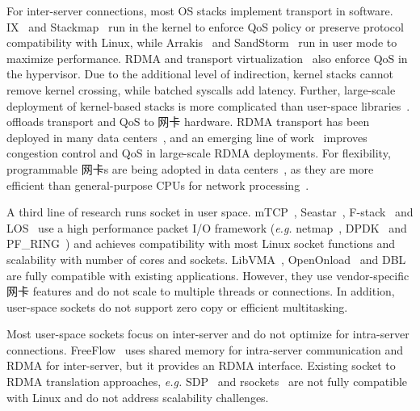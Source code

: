 For inter-server connections, most OS stacks implement transport in software. IX~\cite{belay2017ix} and Stackmap~\cite{yasukata2016stackmap} run in the kernel to enforce QoS policy or preserve protocol compatibility with Linux, while Arrakis~\cite{peter2016arrakis} and SandStorm~\cite{marinos2014network} run in user mode to maximize performance.
RDMA and transport virtualization~\cite{tsai2017lite,niu2017network} also enforce QoS in the hypervisor.
Due to the additional level of indirection, kernel stacks cannot remove kernel crossing, while batched syscalls add latency.
Further, large-scale deployment of kernel-based stacks is more complicated than user-space libraries~\cite{andromeda}.
\sys offloads transport and QoS to 网卡 hardware.
RDMA transport has been deployed in many data centers~\cite{guo2016rdma}, and an emerging line of work~\cite{zhu2015congestion,lu2017memory,mprdma} improves congestion control and QoS in large-scale RDMA deployments.
For flexibility, programmable 网卡s are being adopted in data centers~\cite{smartnic,cavium}, as they are more efficient than general-purpose CPUs for network processing~\cite{kaufmann2015flexnic,li2016clicknp}.



A third line of research runs socket in user space.
mTCP~\cite{jeong2014mtcp}, Seastar~\cite{seastar}, 
F-stack~\cite{fstack} and LOS~\cite{huang2017high} use a high performance packet I/O framework (\textit{e.g.} netmap~\cite{rizzo2012netmap}, DPDK~\cite{dpdk} and PF\_RING~\cite{pf-ring}) and achieves compatibility with most Linux socket functions and scalability with number of cores and sockets.
LibVMA~\cite{libvma}, OpenOnload~\cite{openonload} and DBL~\cite{dbl} are fully compatible with existing applications. However, they use vendor-specific 网卡 features and do not scale to multiple threads or connections.
In addition, user-space sockets do not support zero copy or efficient multitasking.

Most user-space sockets focus on inter-server and do not optimize for intra-server connections.
FreeFlow~\cite{freeflow} uses shared memory for intra-server communication and RDMA for inter-server, but it provides an RDMA interface.
Existing socket to RDMA translation approaches, \textit{e.g.} SDP~\cite{socketsdirect} and rsockets~\cite{rsockets} are not fully compatible with Linux and do not address scalability challenges.


\fi


